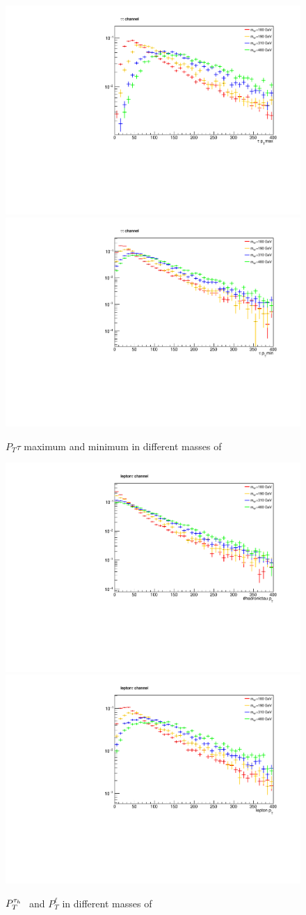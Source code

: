 \begin{figure}[!ht]
\centering
\includegraphics*[width=.45\textwidth]{figs/PT-max.pdf}
\hspace{3mm}
\includegraphics*[width=.45\textwidth]{figs/PT-min.pdf}
\caption{$P_T {\tau}$ maximum and minimum in different masses of \wprime }
\label{fig:pt-hh}
\end{figure}
\begin{figure}[!ht]
\centering
\includegraphics*[width=.45\textwidth]{figs/PT-lh.pdf}
\hspace{3mm}
\includegraphics*[width=.45\textwidth]{figs/PT-ll.pdf}
\caption{$P_T^{\tau_h~}$ and $P_T^{\ell}$ in different masses of \wprime  }
\label{fig:pt-lh}
\end{figure}

  
